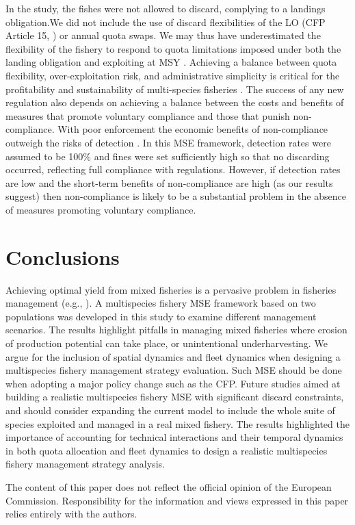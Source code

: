 \documentclass[12pt,oneline,a4paper,numbib]{ouparticle}
\numberwithin{equation}{subsection} %
\begin{document}
In the study, the fishes were not allowed to discard, complying to a landings obligation.We did not include the use of discard flexibilities of the LO (CFP Article 15, \cite{CFP2013}) or annual quota swaps. We may thus have underestimated the flexibility of the fishery to respond to quota limitations imposed under both the landing obligation and exploiting at MSY \cite{Prellezo2016}. Achieving a balance between quota flexibility, over-exploitation risk, and administrative simplicity is critical for the profitability and sustainability of multi-species fisheries \cite{Alzorriz2018}. The success of any new regulation also depends on achieving a balance between the costs and benefits of measures that promote voluntary compliance and those that punish non-compliance. With poor enforcement the economic benefits of non-compliance outweigh the risks of detection \cite{Batsleer2013}. In this MSE framework, detection rates were assumed to be 100\% and fines were set sufficiently high so that no discarding occurred, reflecting full compliance with regulations. However, if detection rates are low and the short-term benefits of non-compliance are high (as our results suggest) then non-compliance is likely to be a substantial problem in the absence of measures promoting voluntary compliance. 

\section{Conclusions}

Achieving optimal yield from mixed fisheries is a pervasive problem in fisheries management (e.g., \cite{Farcas2016, Prellezo2016b, Salomon2014, Ulrich2017, Voss2014}). A multispecies fishery MSE framework based on two populations was developed in this study to examine different management scenarios. The results highlight pitfalls in managing mixed fisheries where erosion of production potential can take place, or unintentional underharvesting. We argue for the inclusion of spatial dynamics and fleet dynamics when designing a multispecies fishery management strategy evaluation. Such MSE should be done when adopting a major policy change such as the CFP. Future studies aimed at building a realistic multispecies fishery MSE with significant discard constraints, and should consider expanding the current model to include the whole suite of species exploited and managed in a real mixed fishery. The results highlighted the importance of accounting for technical interactions and their temporal dynamics in both quota allocation and fleet dynamics to design a realistic multispecies fishery management strategy analysis.


\begin{notes}[Acknowledgements]
The content of this paper does not reflect the official opinion of the European Commission. Responsibility for the information and views expressed in this paper relies entirely with the authors.
\end{notes}



\end{document}
